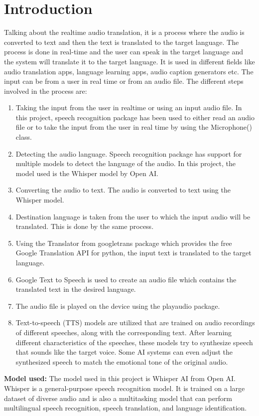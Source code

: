 \documentclass[12px, a4paper]{article}
\begin{document}
\section{Introduction}
Talking about the realtime audio translation, it is a process where the audio is converted to text and then the text is translated to the target language. The process is done in real-time and the user can speak in the target language and the system will translate it to the target language. It is used in different fields like audio translation apps, language learning apps, audio caption generators etc. The input can be from a user in real time or from an audio file. The different steps involved in the process are:
\begin{enumerate}
    \item Taking the input from the user in realtime or using an input audio file. In this project, speech recognition package has been used to either read an audio file or to take the input from the user in real time by using the Microphone() class.
    \item Detecting the audio language. Speech recognition package has support for multiple models to detect the language of the audio. In this project, the model used is the Whisper model by Open AI.
    \item Converting the audio to text. The audio is converted to text using the Whisper model.
    \item Destination language is taken from the user to which the input audio will be translated. This is done by the same process.
    \item Using the Translator from googletrans package which provides the free Google Translation API for python, the input text is translated to the target language.
    \item Google Text to Speech is used to create an audio file which contains the translated text in the desired language.
    \item The audio file is played on the device using the playaudio package.
    \item  Text-to-speech (TTS) models are utilized that are trained on audio recordings of different speeches, along with the corresponding text. After learning different characteristics of the speeches, these models try to synthesize speech that sounds like the target voice. Some AI systems can even adjust the synthesized speech to match the emotional tone of the original audio.
    
\end{enumerate}
\textbf{Model used:}
The model used in this project is Whisper AI from Open AI. Whisper is a general-purpose speech recognition model. It is trained on a large dataset of diverse audio and is also a multitasking model that can perform multilingual speech recognition, speech translation, and language identification.
\end{document}
